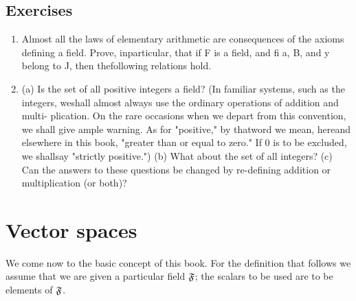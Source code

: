 {\small
\subsection*{Exercises}
\begin{enumerate}
    \item Almost all the laws of elementary arithmetic are consequences of the axioms defining a field. Prove, inparticular, that if F is a field, and fi a, B, and y belong to J, then thefollowing relations hold.
    \item (a) Is the set of all positive integers a field? (In familiar systems, such as the integers, weshall almost always use the ordinary operations of addition and multi- plication. On the rare occasions when we depart from this convention, we shall give ample warning. As for "positive," by thatword we mean, hereand elsewhere in this book, "greater than or equal to zero." If 0 is to be excluded, we shallsay "strictly positive.")
    (b) What about the set of all integers?
    (c) Can the answers to these questions be changed by re-defining addition or multiplication (or both)?
\end{enumerate}

}


\section{Vector spaces}


We come now to the basic concept of this book. For the definition that follows we assume that we are given a particular field \(\frak{F}\); the scalars to be used are to be elements of \(\frak{F}\).

